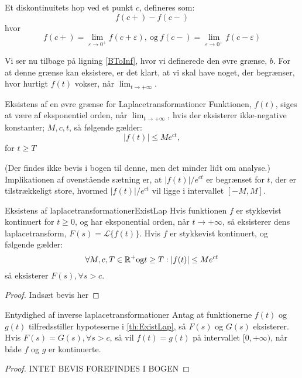 \begin{definition}
Et diskontinuitets hop ved et punkt $c$, defineres som:
$$f(c+) - f(c-)$$
hvor
$$f(c+) = \lim_{\varepsilon\to 0^+} f(c + \varepsilon), \ \text{og} \ f(c-) = \lim_{\varepsilon\to 0^+} f(c - \varepsilon)$$
\end{definition}

Vi ser nu tilbage på ligning \ref{BToInf}, hvor vi definerede den øvre grænse, $b$. For at denne grænse kan eksistere, er det klart, at vi skal have noget, der begrænser, hvor hurtigt $f(t)$ vokser, når $\lim_{t\to+\infty}$.

\begin{mytheo}{Eksistens af en øvre grænse for Laplacetransformationer}{}
Funktionen, $f(t)$, siges at være af eksponentiel orden, når $\lim_{t\to+\infty}$, hvis der eksisterer ikke-negative konstanter; $M, c, t$, så følgende gælder:
$$ |f(t)| \leq Me^{ct},$$
for $t \geq T$
\end{mytheo}
(Der findes ikke bevis i bogen til denne, men det minder lidt om analyse.)
Implikationen af ovenstående sætning er, at $|f(t)| / e^{ct}$ er begrænset for $t$, der er tilstrækkeligt store, hvormed $|f(t)| / e^{ct}$ vil ligge i intervallet $[-M, M]$.

\begin{mytheo}{Eksistens af laplacetransformationer}{ExistLap}
Hvis funktionen $f$ er stykkevist kontinuert for $t \geq 0$, og har eksponential orden, når $t \to +\infty$, så eksisterer dens laplacetransform, $F(s) = \mathcal{L}\{f(t)\}$. Hvis $f$ er stykkevist kontinuert, og følgende gælder:
$$\forall M,c,T \in \mathbb{R}^+ \textnormal{og} t \geq T: |f(t)| \leq Me^{ct}$$
så eksisterer $F(s), \forall s > c$.
\end{mytheo}
\begin{proof}
Indsæt bevis her
\end{proof}

\begin{mytheo}{Entydighed af inverse laplacetransformationer}{}
Antag at funktionerne $f(t)$ og $g(t)$ tilfredsstiller hypoteserne i \ref{th:ExistLap}, så $F(s)$ og $G(s)$ eksisterer. Hvis $F(s) = G(s), \forall s > c$, så vil $f(t) = g(t)$ på intervallet $[0,+\infty)$, når både $f$ og $g$ er kontinuerte.
\end{mytheo}
\begin{proof}
INTET BEVIS FOREFINDES I BOGEN
\end{proof}